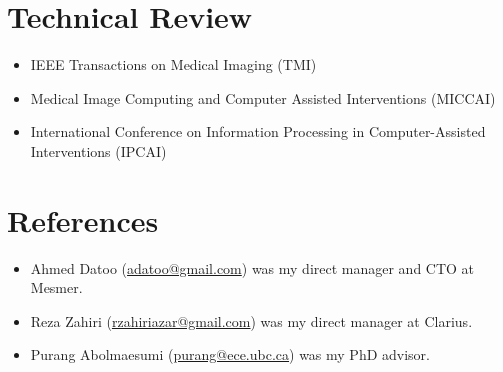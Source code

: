 \documentclass[letterpaper,11pt]{article}
\newcommand{\reviewItem}[1]{
  \item\small{#1 \vspace{-2pt}}
}
\newcommand{\resumeSubHeadingListStart}{\begin{itemize}[leftmargin=*]}
\newcommand{\resumeSubHeadingListEnd}{\end{itemize}}
\begin{document}
\section{Technical Review}
  \resumeSubHeadingListStart
    \reviewItem{IEEE Transactions on Medical Imaging (TMI)}
    \reviewItem{Medical Image Computing and Computer Assisted Interventions (MICCAI)}
    \reviewItem{International Conference on Information Processing in Computer-Assisted Interventions (IPCAI)}
  \resumeSubHeadingListEnd

  \section{References}
    \resumeSubHeadingListStart
      \reviewItem{Ahmed Datoo (\href{mailto:adatoo@gmail.com}{adatoo@gmail.com}) was my direct manager and CTO at Mesmer.}
      \reviewItem{Reza Zahiri (\href{mailto:rzahiriazar@gmail.com}{rzahiriazar@gmail.com}) was my direct manager at Clarius.}
      \reviewItem{Purang Abolmaesumi (\href{mailto:purang@ece.ubc.ca}{purang@ece.ubc.ca}) was my PhD advisor.}
    \resumeSubHeadingListEnd
\end{document}
